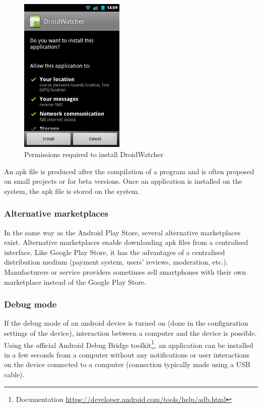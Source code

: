 \begin{figure}[h]
  \centering
  \includegraphics[width=5cm]{images/permissions.png}
  \caption{Permissions required to install DroidWatcher}
  \label{fig:perm-dw}
\end{figure}

An apk file is produced after the compilation of a program and is often proposed on small projects or for beta versions.
Once an application is installed on the system, the apk file is stored on the system.

\subsubsection{Alternative marketplaces}

In the same way as the Android Play Store, several alternative marketplaces exist.
Alternative marketplaces enable downloading apk files from a centralised interface.
Like Google Play Store, it has the advantages of a centralised distribution medium (payment system, users' reviews, moderation, etc.).
Manufacturers or service providers sometimes sell smartphones with their own marketplace instead of the Google Play Store.\\

\subsubsection{Debug mode}
If the debug mode of an android device is turned on (done in the configuration settings of the device), interaction between a computer and the device is possible.
Using the official Android Debug Bridge toolkit\footnote{Documentation \url{https://developer.android.com/tools/help/adb.html}}, an application can be installed in a few seconds from a computer without any notifications or user interactions on the device connected to a computer (connection typically made using a USB cable).

